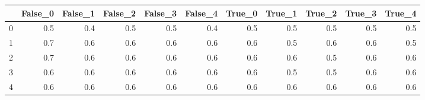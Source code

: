 \begin{tabular}{lrrrrrrrrrr}
\toprule
{} &  False\_0 &  False\_1 &  False\_2 &  False\_3 &  False\_4 &  True\_0 &  True\_1 &  True\_2 &  True\_3 &  True\_4 \\ \hline
\midrule
0 &      0.5 &      0.4 &      0.5 &      0.5 &      0.4 &     0.5 &     0.5 &     0.5 &     0.5 &     0.5 \\ \hline
1 &      0.7 &      0.6 &      0.6 &      0.6 &      0.6 &     0.6 &     0.5 &     0.6 &     0.6 &     0.5 \\ \hline
2 &      0.7 &      0.6 &      0.6 &      0.6 &      0.6 &     0.6 &     0.6 &     0.5 &     0.6 &     0.6 \\ \hline
3 &      0.6 &      0.6 &      0.6 &      0.6 &      0.6 &     0.6 &     0.5 &     0.5 &     0.6 &     0.6 \\ \hline
4 &      0.6 &      0.6 &      0.6 &      0.6 &      0.6 &     0.6 &     0.6 &     0.6 &     0.6 &     0.6 \\ \hline
\bottomrule
\end{tabular}
